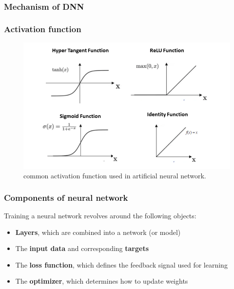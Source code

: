 \documentclass{beamer}
\begin{document}
\begin{frame}
\frametitle{Mechanism of DNN}
\begin{figure}[H]
\centering
{} 
\end{figure}
\end{frame}


\begin{frame}
\frametitle{Activation function}
\begin{figure}
\includegraphics[scale=0.35]{./figures/activation.png}
\caption{common activation function used in artificial neural network.}
\end{figure}
\end{frame}

\begin{frame}
\frametitle{Components of neural network}
Training a neural network revolves around the following objects:
\begin{itemize}
\item \textbf{Layers}, which are combined into a network (or model)
\item The \textbf{input data} and corresponding \textbf{targets}
\item The \textbf{loss function}, which defines the feedback signal used for learning
\item The \textbf{optimizer}, which determines how to update weights
\end{itemize}
\end{frame}
\end{document}

